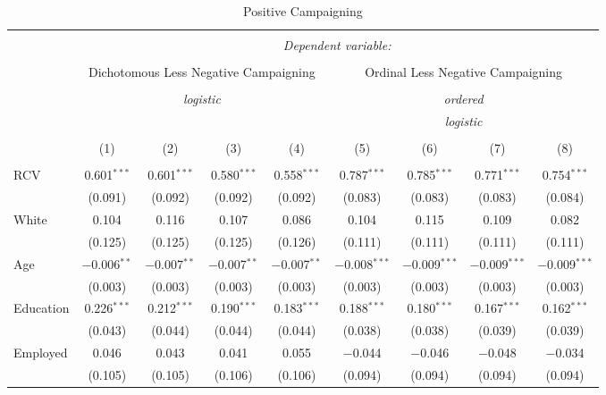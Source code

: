 \documentclass{article}
\begin{document}
\begin{landscape}
\begin{table}[!htbp] \centering 
  \caption{Positive Campaigning} 
  \label{} 
\begin{tabular}{@{\extracolsep{5pt}}lcccccccc} 
\\[-1.8ex]\hline 
\hline \\[-1.8ex] 
 & \multicolumn{8}{c}{\textit{Dependent variable:}} \\ 
\cline{2-9} 
\\[-1.8ex] & \multicolumn{4}{c}{Dichotomous Less Negative Campaigning} & \multicolumn{4}{c}{Ordinal Less Negative Campaigning} \\ 
\\[-1.8ex] & \multicolumn{4}{c}{\textit{logistic}} & \multicolumn{4}{c}{\textit{ordered}} \\ 
 & \multicolumn{4}{c}{\textit{}} & \multicolumn{4}{c}{\textit{logistic}} \\ 
\\[-1.8ex] & (1) & (2) & (3) & (4) & (5) & (6) & (7) & (8)\\ 
\hline \\[-1.8ex] 
 RCV & 0.601$^{***}$ & 0.601$^{***}$ & 0.580$^{***}$ & 0.558$^{***}$ & 0.787$^{***}$ & 0.785$^{***}$ & 0.771$^{***}$ & 0.754$^{***}$ \\ 
  & (0.091) & (0.092) & (0.092) & (0.092) & (0.083) & (0.083) & (0.083) & (0.084) \\ 
  White & 0.104 & 0.116 & 0.107 & 0.086 & 0.104 & 0.115 & 0.109 & 0.082 \\ 
  & (0.125) & (0.125) & (0.125) & (0.126) & (0.111) & (0.111) & (0.111) & (0.111) \\ 
  Age & $-$0.006$^{**}$ & $-$0.007$^{**}$ & $-$0.007$^{**}$ & $-$0.007$^{**}$ & $-$0.008$^{***}$ & $-$0.009$^{***}$ & $-$0.009$^{***}$ & $-$0.009$^{***}$ \\ 
  & (0.003) & (0.003) & (0.003) & (0.003) & (0.003) & (0.003) & (0.003) & (0.003) \\ 
  Education & 0.226$^{***}$ & 0.212$^{***}$ & 0.190$^{***}$ & 0.183$^{***}$ & 0.188$^{***}$ & 0.180$^{***}$ & 0.167$^{***}$ & 0.162$^{***}$ \\ 
  & (0.043) & (0.044) & (0.044) & (0.044) & (0.038) & (0.038) & (0.039) & (0.039) \\ 
  Employed & 0.046 & 0.043 & 0.041 & 0.055 & $-$0.044 & $-$0.046 & $-$0.048 & $-$0.034 \\ 
  & (0.105) & (0.105) & (0.106) & (0.106) & (0.094) & (0.094) & (0.094) & (0.094) \\ 

\end{tabular}
\end{table}
\end{landscape}
\end{document}
